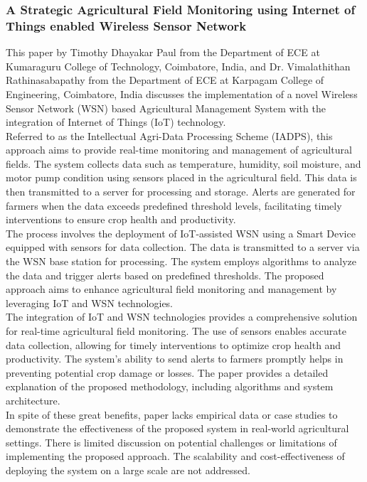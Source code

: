 \documentclass[12pt, a4paper]{article}
\begin{document}
\subsubsection{A Strategic Agricultural Field Monitoring using Internet of Things enabled Wireless Sensor Network}
This paper by Timothy Dhayakar Paul from the Department of ECE at Kumaraguru College of Technology, Coimbatore, India, and Dr. Vimalathithan Rathinasabapathy from the Department of ECE at Karpagam College of Engineering, Coimbatore, India \cite{paul2021strategic} discusses the implementation of a novel Wireless Sensor Network (WSN) based Agricultural Management System with the integration of Internet of Things (IoT) technology.\\
Referred to as the Intellectual Agri-Data Processing Scheme (IADPS), this approach aims to provide real-time monitoring and management of agricultural fields. The system collects data such as temperature, humidity, soil moisture, and motor pump condition using sensors placed in the agricultural field. This data is then transmitted to a server for processing and storage. Alerts are generated for farmers when the data exceeds predefined threshold levels, facilitating timely interventions to ensure crop health and productivity.\\
The process involves the deployment of IoT-assisted WSN using a Smart Device equipped with sensors for data collection. The data is transmitted to a server via the WSN base station for processing. The system employs algorithms to analyze the data and trigger alerts based on predefined thresholds. The proposed approach aims to enhance agricultural field monitoring and management by leveraging IoT and WSN technologies.\\
The integration of IoT and WSN technologies provides a comprehensive solution for real-time agricultural field monitoring. The use of sensors enables accurate data collection, allowing for timely interventions to optimize crop health and productivity. The system's ability to send alerts to farmers promptly helps in preventing potential crop damage or losses. The paper provides a detailed explanation of the proposed methodology, including algorithms and system architecture.\\
In spite of these great benefits, paper lacks empirical data or case studies to demonstrate the effectiveness of the proposed system in real-world agricultural settings. There is limited discussion on potential challenges or limitations of implementing the proposed approach. The scalability and cost-effectiveness of deploying the system on a large scale are not addressed. 
\end{document}
